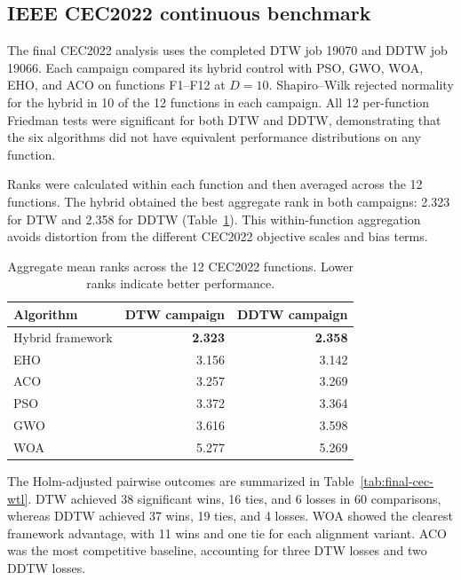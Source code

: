 \subsection{IEEE CEC2022 continuous benchmark}
\label{sec:final-stat-cec2022}

The final CEC2022 analysis uses the completed DTW job 19070 and DDTW job
19066. Each campaign compared its hybrid control with PSO, GWO, WOA, EHO, and
ACO on functions F1--F12 at $D=10$. Shapiro--Wilk rejected normality for the
hybrid in 10 of the 12 functions in each campaign. All 12 per-function
Friedman tests were significant for both DTW and DDTW, demonstrating that the
six algorithms did not have equivalent performance distributions on any
function.

Ranks were calculated within each function and then averaged across the 12
functions. The hybrid obtained the best aggregate rank in both campaigns:
2.323 for DTW and 2.358 for DDTW (Table~\ref{tab:final-cec-ranks}). This
within-function aggregation avoids distortion from the different CEC2022
objective scales and bias terms.

\begin{table}[htbp]
\centering
\caption{Aggregate mean ranks across the 12 CEC2022 functions. Lower ranks
indicate better performance.}
\label{tab:final-cec-ranks}
\begin{tabular}{lrr}
\toprule
Algorithm & DTW campaign & DDTW campaign \\
\midrule
Hybrid framework & \textbf{2.323} & \textbf{2.358} \\
EHO              & 3.156 & 3.142 \\
ACO              & 3.257 & 3.269 \\
PSO              & 3.372 & 3.364 \\
GWO              & 3.616 & 3.598 \\
WOA              & 5.277 & 5.269 \\
\bottomrule
\end{tabular}
\end{table}

The Holm-adjusted pairwise outcomes are summarized in
Table~\ref{tab:final-cec-wtl}. DTW achieved 38 significant wins, 16 ties, and
6 losses in 60 comparisons, whereas DDTW achieved 37 wins, 19 ties, and 4
losses. WOA showed the clearest framework advantage, with 11 wins and one tie
for each alignment variant. ACO was the most competitive baseline, accounting
for three DTW losses and two DDTW losses.

